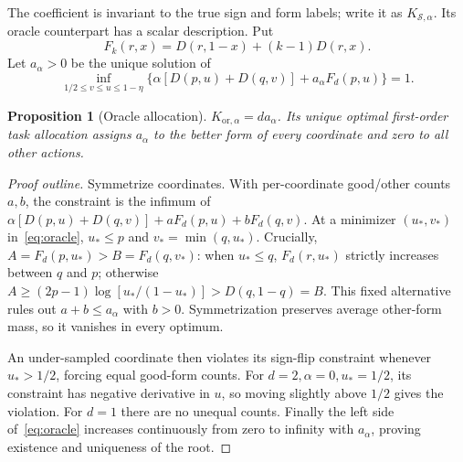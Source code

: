 \documentclass[sigconf,anonymous,review]{acmart}
\newtheorem{proposition}[theorem]{Proposition}
\newcommand{\Kor}{K_{\mathrm{or},\alpha}}
\newcommand{\KS}{K_{\mathcal S,\alpha}}
\begin{document}
The coefficient is invariant to the true sign and form labels; write it as $\KS$. Its oracle counterpart has a scalar description. Put
\[
 F_k(r,x)=D(r,1-x)+(k-1)D(r,x).
\]
Let $a_\alpha>0$ be the unique solution of
\begin{equation}\label{eq:oracle}
 \inf_{1/2\le v\le u\le1-\eta}
 \{\alpha[D(p,u)+D(q,v)]+a_\alpha F_d(p,u)\}=1.
\end{equation}
\begin{proposition}[Oracle allocation]\label{prop:oracle}
$\Kor=da_\alpha$. Its unique optimal first-order task allocation assigns $a_\alpha$ to the better form of every coordinate and zero to all other actions.
\end{proposition}
\begin{proof}[Proof outline]
Symmetrize coordinates. With per-coordinate good/other counts $a,b$, the constraint is the infimum of $\alpha[D(p,u)+D(q,v)]+aF_d(p,u)+bF_d(q,v)$. At a minimizer $(u_*,v_*)$ in~\eqref{eq:oracle}, $u_*\le p$ and $v_*=\min(q,u_*)$. Crucially, $A=F_d(p,u_*)>B=F_d(q,v_*)$: when $u_*\le q$, $F_d(r,u_*)$ strictly increases between $q$ and $p$; otherwise $A\ge(2p-1)\log[u_*/(1-u_*)]>D(q,1-q)=B$. This fixed alternative rules out $a+b\le a_\alpha$ with $b>0$. Symmetrization preserves average other-form mass, so it vanishes in every optimum.

An under-sampled coordinate then violates its sign-flip constraint whenever $u_*>1/2$, forcing equal good-form counts. For $d=2,\alpha=0,u_*=1/2$, its constraint has negative derivative in $u$, so moving slightly above $1/2$ gives the violation. For $d=1$ there are no unequal counts. Finally the left side of~\eqref{eq:oracle} increases continuously from zero to infinity with $a_\alpha$, proving existence and uniqueness of the root.
\end{proof}
\end{document}

